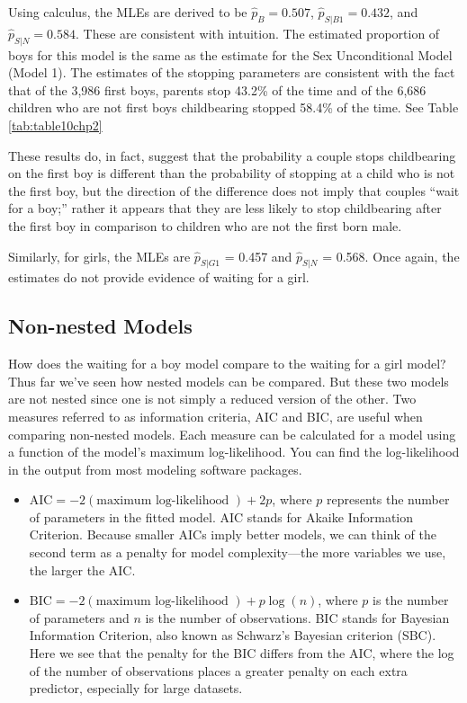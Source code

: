 \documentclass[
]{krantz}
\providecommand{\tightlist}{%
  \setlength{\itemsep}{0pt}\setlength{\parskip}{0pt}}
\begin{document}
Using calculus, the MLEs are derived to be \(\hat{p}_B = 0.507\), \(\hat{p}_{S|B1} = 0.432\), and \(\hat{p}_{S|N} = 0.584\). These are consistent with intuition. The estimated proportion of boys for this model is the same as the estimate for the Sex Unconditional Model (Model 1). The estimates of the stopping parameters are consistent with the fact that of the 3,986 first boys, parents stop 43.2\% of the time and of the 6,686 children who are not first boys childbearing stopped 58.4\% of the time. See Table \ref{tab:table10chp2}

These results do, in fact, suggest that the probability a couple stops childbearing on the first boy is different than the probability of stopping at a child who is not the first boy, but the direction of the difference does not imply that couples ``wait for a boy;'' rather it appears that they are less likely to stop childbearing after the first boy in comparison to children who are not the first born male.

Similarly, for girls, the MLEs are \(\hat{p}_{S|G1}\) = 0.457 and \(\hat{p}_{S|N}\) = 0.568. Once again, the estimates do not provide evidence of waiting for a girl.

\hypertarget{non-nested-models}{%
\subsection{Non-nested Models}\label{non-nested-models}}

How does the waiting for a boy model compare to the waiting for a girl model? Thus far we've seen how nested models can be compared. But these two models are not nested since one is not simply a reduced version of the other. Two measures referred to as information criteria, AIC and BIC, are useful when comparing non-nested models. Each measure can be calculated for a model using a function of the model's maximum log-likelihood. You can find the log-likelihood in the output from most modeling software packages.

\begin{itemize}
\tightlist
\item
  \(\textrm{AIC} = -2 (\textrm{maximum log-likelihood }) + 2p\), where \(p\) represents the number of parameters in the fitted model. AIC stands for Akaike Information Criterion.  Because smaller AICs imply better models, we can think of the second term as a penalty for model complexity---the more variables we use, the larger the AIC.
\item
  \(\textrm{BIC} = -2 (\textrm{maximum log-likelihood }) + p\log(n)\), where \(p\) is the number of parameters and \(n\) is the number of observations. BIC stands for Bayesian Information Criterion,  also known as Schwarz's Bayesian criterion (SBC). Here we see that the penalty for the BIC differs from the AIC, where the log of the number of observations places a greater penalty on each extra predictor, especially for large datasets.
\end{itemize}
\end{document}
